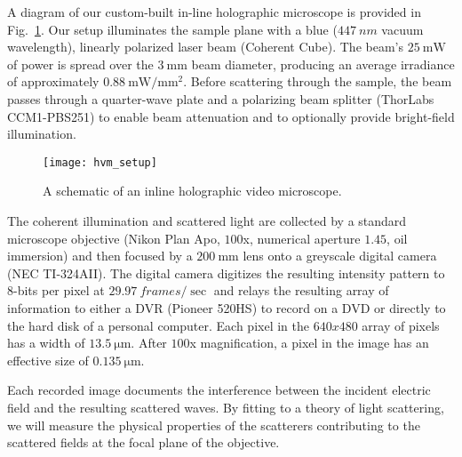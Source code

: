 A diagram of our custom-built in-line holographic microscope
is provided in Fig.~\ref{fig:hvm_setup}.
Our setup illuminates
the sample plane with a blue ($\SI{447}{nm}$ vacuum wavelength),
linearly polarized laser beam (Coherent Cube). The beam's
$\SI{25}{\mW}$ of power is spread over the $\SI{3}{\mm}$ beam
diameter, producing an average irradiance of approximately
$\SI{0.88}{\mW / \mm^2}$. Before scattering through the
sample, the beam passes through a quarter-wave plate and a
polarizing beam splitter (ThorLabs CCM1-PBS251) to enable
beam attenuation and to optionally provide bright-field
illumination.


\begin{figure}
  \centering
  \texttt{[image: hvm\_setup]}
  \caption{A schematic of an inline holographic video microscope.}
  \label{fig:hvm_setup}
\end{figure}


The coherent illumination and scattered light are collected by a
standard microscope objective (Nikon Plan Apo, $\num{100}$x,
numerical aperture $\num{1.45}$, oil immersion) and then focused
by a $\SI{200}{\mm}$ lens onto a greyscale digital camera
(NEC TI-324AII). The digital camera digitizes the resulting intensity
pattern to $8$-bits per pixel at $\SI{29.97}{frames / \sec}$ and relays the
resulting array of information to either a DVR (Pioneer 520HS) to record
on a DVD or directly to the hard disk of a personal computer.
Each pixel in the $\si{640 x 480}$ array of pixels has a width of
$\SI{13.5}{\um}$. After $100$x magnification, a pixel in the
image has an effective size of $\SI{0.135}{\um}$.

Each recorded image documents the interference between the incident
electric field and the resulting scattered waves. By fitting
to a theory of light scattering, we will measure the physical
properties of the scatterers contributing to the scattered fields
at the focal plane of the objective.




